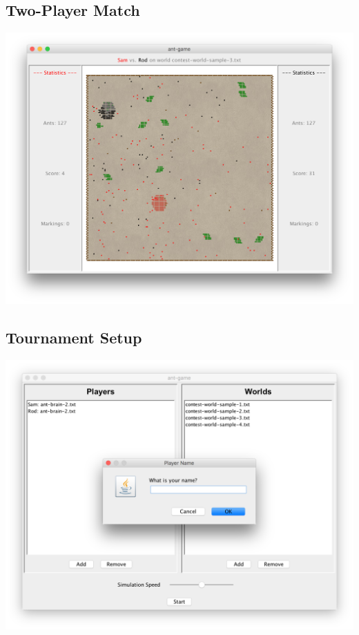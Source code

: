 \documentclass[11pt]{article}
\begin{document}
\subsection{Two-Player Match}

\begin{center}
\includegraphics[width=\textwidth]{two-player-match}
\end{center}

\subsection{Tournament Setup}

\begin{center}
\includegraphics[width=\textwidth]{tournament-setup}
\end{center}
\end{document}
